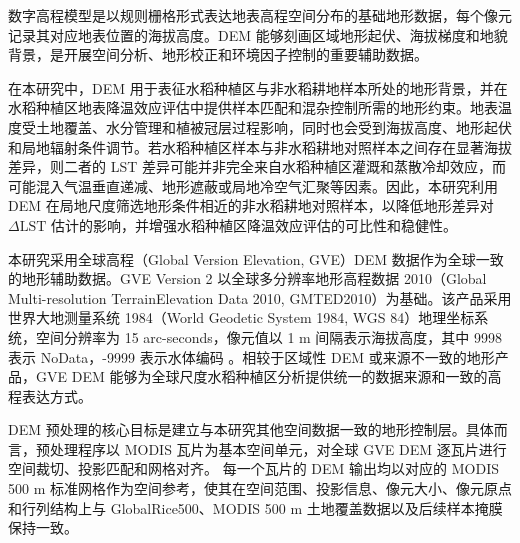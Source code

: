 数字高程模型是以规则栅格形式表达地表高程空间分布的基础地形数据，每个像元记录其对应地表位置的海拔高度。DEM 能够刻画区域地形起伏、海拔梯度和地貌背景，是开展空间分析、地形校正和环境因子控制的重要辅助数据。

在本研究中，DEM 用于表征水稻种植区与非水稻耕地样本所处的地形背景，并在水稻种植区地表降温效应评估中提供样本匹配和混杂控制所需的地形约束。地表温度受土地覆盖、水分管理和植被冠层过程影响，同时也会受到海拔高度、地形起伏和局地辐射条件调节。若水稻种植区样本与非水稻耕地对照样本之间存在显著海拔差异，则二者的 LST 差异可能并非完全来自水稻种植区灌溉和蒸散冷却效应，而可能混入气温垂直递减、地形遮蔽或局地冷空气汇聚等因素。因此，本研究利用 DEM 在局地尺度筛选地形条件相近的非水稻耕地对照样本，以降低地形差异对 $\Delta \mathrm{LST}$ 估计的影响，并增强水稻种植区降温效应评估的可比性和稳健性。

本研究采用全球高程（Global Version Elevation, GVE）DEM 数据作为全球一致的地形辅助数据。GVE Version 2 以全球多分辨率地形高程数据 2010（Global Multi-resolution Terrain\newline Elevation Data 2010, GMTED2010）为基础。该产品采用世界大地测量系统 1984（World Geodetic System 1984, WGS 84）地理坐标系统，空间分辨率为 15 arc-seconds，像元值以 1 m 间隔表示海拔高度，其中 9998 表示 NoData，-9999 表示水体编码 \citep{GVEGlobalMap,Danielson2011GMTED2010}。相较于区域性 DEM 或来源不一致的地形产品，GVE DEM 能够为全球尺度水稻种植区分析提供统一的数据来源和一致的高程表达方式。

DEM 预处理的核心目标是建立与本研究其他空间数据一致的地形控制层。具体而言，预处理程序以 MODIS 瓦片为基本空间单元，对全球 GVE DEM 逐瓦片进行空间裁切、投影匹配和网格对齐。
每一个瓦片的 DEM 输出均以对应的 MODIS 500 m 标准网格作为空间参考，使其在空间范围、投影信息、像元大小、像元原点和行列结构上与 GlobalRice500、MODIS 500 m 土地覆盖数据以及后续样本掩膜保持一致。
